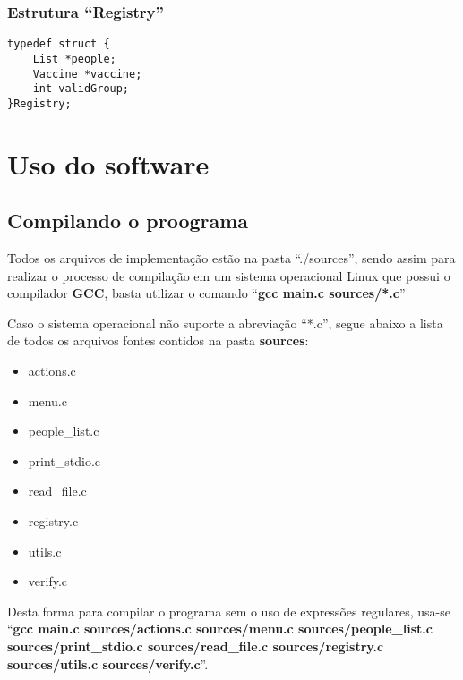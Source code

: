 \documentclass[12pt, a4paper]{article}
\begin{document}
\subsubsection{Estrutura ``Registry''}\label{Estrutura ``Registry''}
\begin{lstlisting}
typedef struct {
    List *people;
    Vaccine *vaccine;
    int validGroup;
}Registry;
\end{lstlisting}
\cleardoublepage
\section{Uso do software}\label{Uso do software}
\subsection{Compilando o proograma}\label{Compilando o proograma}
Todos os arquivos de implementação estão na pasta ``./sources'', sendo assim para realizar o processo de compilação em um sistema operacional Linux que possui o compilador \textbf{GCC}, basta utilizar o comando ``\textbf{gcc main.c sources/*.c}''

Caso o sistema operacional não suporte a abreviação ``*.c'', segue abaixo a lista de todos os arquivos fontes contidos na pasta \textbf{sources}:
\begin{itemize}
    \item actions.c
    \item menu.c
    \item people\_list.c
    \item print\_stdio.c
    \item read\_file.c
    \item registry.c
    \item utils.c
    \item verify.c
\end{itemize}

Desta forma para compilar o programa sem o uso de expressões regulares, usa-se ``\textbf{gcc main.c sources/actions.c sources/menu.c sources/people\_list.c sources/print\_stdio.c sources/read\_file.c sources/registry.c sources/utils.c sources/verify.c}''.
\end{document}
